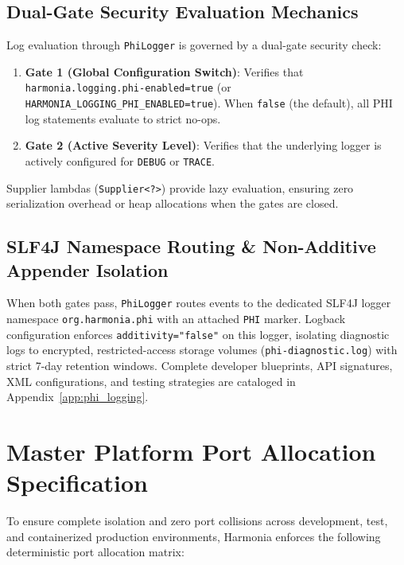 \subsection{Dual-Gate Security Evaluation Mechanics}
Log evaluation through \texttt{PhiLogger} is governed by a dual-gate security check:
\begin{enumerate}
    \item \textbf{Gate 1 (Global Configuration Switch)}: Verifies that \texttt{harmonia.logging.phi-enabled=true} (or \texttt{HARMONIA\_LOGGING\_PHI\_ENABLED=true}). When \texttt{false} (the default), all PHI log statements evaluate to strict no-ops.
    \item \textbf{Gate 2 (Active Severity Level)}: Verifies that the underlying logger is actively configured for \texttt{DEBUG} or \texttt{TRACE}.
\end{enumerate}
Supplier lambdas (\texttt{Supplier<?>}) provide lazy evaluation, ensuring zero serialization overhead or heap allocations when the gates are closed.

\subsection{SLF4J Namespace Routing \& Non-Additive Appender Isolation}
When both gates pass, \texttt{PhiLogger} routes events to the dedicated SLF4J logger namespace \texttt{org.harmonia.phi} with an attached \texttt{PHI} marker. Logback configuration enforces \texttt{additivity="false"} on this logger, isolating diagnostic logs to encrypted, restricted-access storage volumes (\texttt{phi-diagnostic.log}) with strict 7-day retention windows. Complete developer blueprints, API signatures, XML configurations, and testing strategies are cataloged in Appendix~\ref{app:phi_logging}.

\section{Master Platform Port Allocation Specification}

To ensure complete isolation and zero port collisions across development, test, and containerized production environments, Harmonia enforces the following deterministic port allocation matrix:

